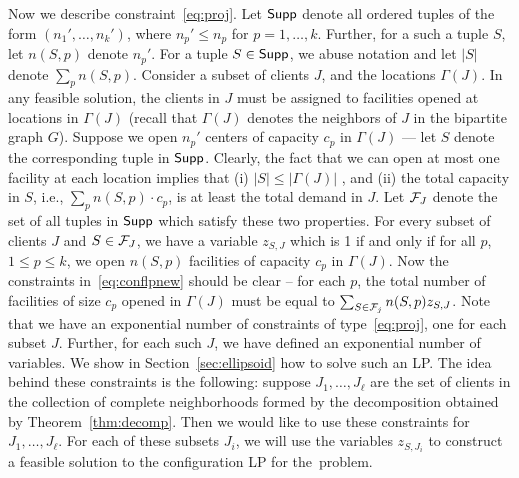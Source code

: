 Now we describe constraint~\eqref{eq:proj}.
Let $\mathsf{Supp}$ denote all ordered tuples of the form
$(n_1', \ldots, n_k')$, where $n_p' \leq n_p$ for $p=1, \ldots, k$. Further, for a such a tuple $S$, let $n(S,p)$ denote $n_p'$.
For a tuple  $S \in \mathsf{Supp}$, we abuse notation and let $|S|$ denote $\sum_p n(S,p)$.
 Consider a subset of clients $J$, and the locations $\Gamma(J)$.
 In any feasible solution, the clients in $J$ must be assigned to facilities opened at locations in $\Gamma(J)$ (recall that $\Gamma(J)$ denotes
 the neighbors of $J$ in the bipartite graph $G$).
 Suppose we open $n_p'$ centers of capacity $c_p$ in $\Gamma(J)$ --- let $S$ denote the corresponding tuple
 in $\mathsf{Supp}$. Clearly, the fact that we can open at most one facility at each location implies that (i) $|S| \leq |\Gamma(J)|$ , and (ii) the total capacity in $S$, i.e.,
 $\sum_p n(S,p) \cdot c_p$, is at least the total demand in $J$. Let ${\cal F}_J$ denote the set of all tuples
 in $\mathsf{Supp}$ which satisfy these two properties. For every subset of clients $J$ and $S \in {\cal F}_J$, we have a variable $z_{S,J}$ which is 1 if and only if
 for all $p$, $1 \leq p \leq k$,
 we open $n(S,p)$ facilities of capacity $c_p$ in $\Gamma(J)$. Now the constraints in~\eqref{eq:conflpnew} should be clear -- for each $p$, the total number of
 facilities of size $c_p$ opened in $\Gamma(J)$ must be equal to $\sum_{S \in {\cal F}_j} n(S,p) z_{S,J}$. Note that we have an exponential number of constraints of type~\eqref{eq:proj}, one for each subset $J$. Further, for each such $J$, we have defined an exponential number of variables. We show in Section~\ref{sec:ellipsoid} how to solve such an LP. The idea behind these constraints is the following: suppose $J_1, \ldots, J_\ell$ are the set of 
 clients in the collection of complete neighborhoods formed by the decomposition obtained by Theorem~\ref{thm:decomp}. Then we would like to 
 use these constraints for $J_1, \ldots, J_\ell$. For each of these subsets $J_i$, we will use the variables $z_{S, J_i}$ to construct a feasible solution 
 to the configuration LP for the~\cckp problem. 




